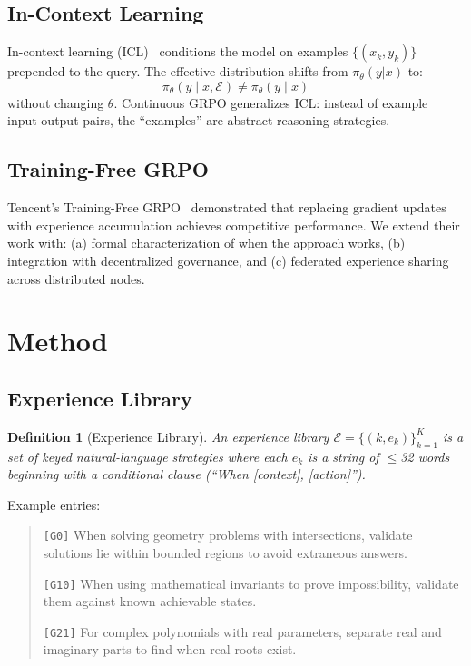 \documentclass[11pt,letterpaper]{article}
\newtheorem{definition}{Definition}[section]
\begin{document}
\subsection{In-Context Learning}

In-context learning (ICL)~\cite{brown2020gpt3} conditions the model on examples $\{(x_k, y_k)\}$ prepended to the query.  The effective distribution shifts from $\pi_\theta(y|x)$ to:
\begin{equation}
    \pi_\theta(y \mid x, \mathcal{E}) \neq \pi_\theta(y \mid x)
\end{equation}
without changing $\theta$.  Continuous GRPO generalizes ICL: instead of example input-output pairs, the ``examples'' are abstract reasoning strategies.

\subsection{Training-Free GRPO}

Tencent's Training-Free GRPO~\cite{tencent2025trainingfree} demonstrated that replacing gradient updates with experience accumulation achieves competitive performance.  We extend their work with: (a) formal characterization of when the approach works, (b) integration with decentralized governance, and (c) federated experience sharing across distributed nodes.

\section{Method}
\label{sec:method}

\subsection{Experience Library}

\begin{definition}[Experience Library]
An experience library $\mathcal{E} = \{(k, e_k)\}_{k=1}^K$ is a set of keyed natural-language strategies where each $e_k$ is a string of $\leq$32 words beginning with a conditional clause (``When [context], [action]'').
\end{definition}

Example entries:
\begin{quote}
\small
\texttt{[G0]} When solving geometry problems with intersections, validate solutions lie within bounded regions to avoid extraneous answers.

\texttt{[G10]} When using mathematical invariants to prove impossibility, validate them against known achievable states.

\texttt{[G21]} For complex polynomials with real parameters, separate real and imaginary parts to find when real roots exist.
\end{quote}
\end{document}

